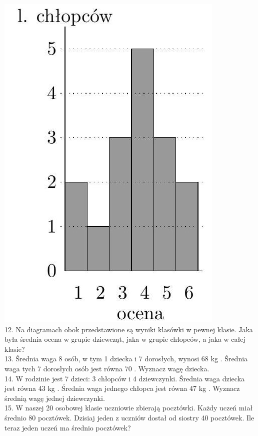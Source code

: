 \documentclass[10pt]{article}
\begin{document}
\includegraphics[max width=\textwidth, center]{2024_11_21_e9b4faa005d5be2cc318g-144(1)}\\
12. Na diagramach obok przedstawione są wyniki klasówki w pewnej klasie. Jaka była średnia ocena w grupie dziewcząt, jaka w grupie chłopców, a jaka w całej klasie?\\
13. Średnia waga 8 osób, w tym 1 dziecka i 7 dorosłych, wynosi 68 kg . Średnia waga tych 7 dorosłych osób jest równa 70 . Wyznacz wagę dziecka.\\
14. W rodzinie jest 7 dzieci: 3 chłopców i 4 dziewczynki. Średnia waga dziecka jest równa 43 kg . Średnia waga jednego chłopca jest równa 47 kg . Wyznacz średnią wagę jednej dziewczynki.\\
15. W naszej 20 osobowej klasie uczniowie zbierają pocztówki. Każdy uczeń miał średnio 80 pocztówek. Dzisiaj jeden z uczniów dostał od siostry 40 pocztówek. Ile teraz jeden uczeń ma średnio pocztówek?
\end{document}
